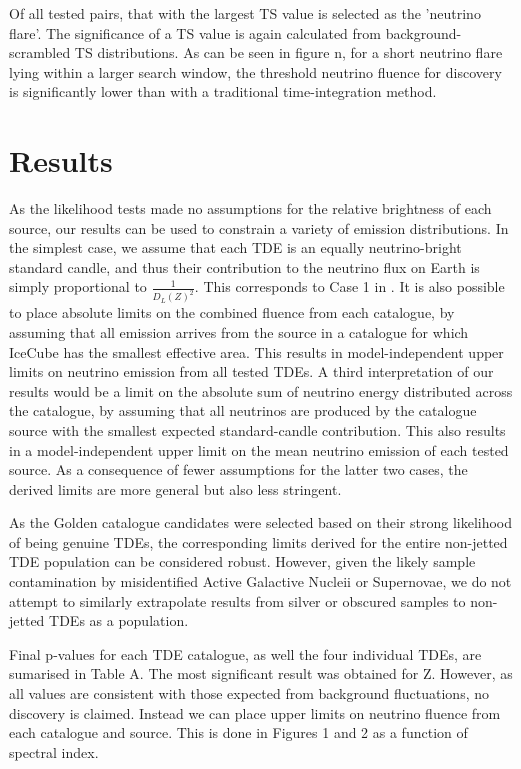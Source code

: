 \documentclass[twocolumn, tighten, linenumbers]{aastex62}
\begin{document}
Of all tested pairs, that with the largest TS value is selected as the 'neutrino flare'. The significance of a TS value is again calculated from background-scrambled TS distributions. As can be seen in figure n, for a short neutrino flare lying within a larger search window, the threshold neutrino fluence for discovery is significantly lower than with a traditional time-integration method.

\section{Results}
\label{sec:Results}

As the likelihood tests made no assumptions for the relative brightness of each source, our results can be used to constrain a variety of emission distributions. In the simplest case, we assume that each TDE is an equally neutrino-bright standard candle, and thus their contribution to the neutrino flux on Earth is simply proportional to $\frac{1}{D_{L}(Z)^{2}}$. This corresponds to Case 1 in \cite{daifang16}. It is also possible to place absolute limits on the combined fluence from each catalogue, by assuming that all emission arrives from the source in a catalogue for which IceCube has the smallest effective area. This results in model-independent upper limits on neutrino emission from all tested TDEs. A third interpretation of our results would be a limit on the absolute sum of neutrino energy distributed across the catalogue, by assuming that all neutrinos are produced by the catalogue source with the smallest expected standard-candle contribution. This also results in a model-independent upper limit on the mean neutrino emission of each tested source. As a consequence of fewer assumptions for the latter two cases, the derived limits are more general but also less stringent. 

As the Golden catalogue candidates were selected based on their strong likelihood of being genuine TDEs, the corresponding limits derived for the entire non-jetted TDE population can be considered robust. However, given the likely sample contamination by misidentified Active Galactive Nucleii or Supernovae, we do not attempt to similarly extrapolate results from silver or obscured samples to non-jetted TDEs as a population.

Final p-values for each TDE catalogue, as well the four individual TDEs, are sumarised in Table A. The most significant result was obtained for Z. However, as all values are consistent with those expected from background fluctuations, no discovery is claimed. Instead we can place upper limits on neutrino fluence from each catalogue and source. This is done in Figures 1 and 2 as a function of spectral index.
\end{document}
